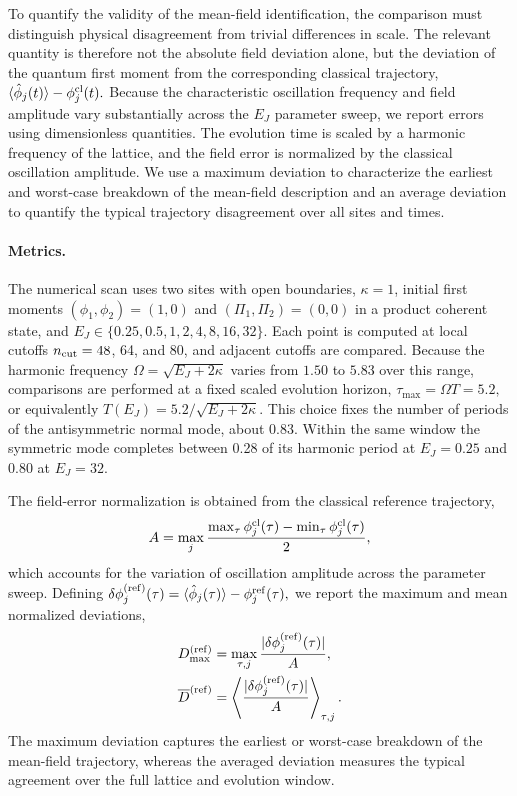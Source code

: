 \documentclass[pra,twocolumn,superscriptaddress,nofootinbib,floatfix]{revtex4-2}
\theoremstyle{remark}
\newcommand{\revcolor}{\color{blue}}
\DeclareRobustCommand{\rev}[1]{{\revcolor #1}}
\begin{document}
To quantify the validity of the mean-field identification, the comparison must distinguish physical disagreement from trivial differences in scale. The relevant quantity is therefore not the absolute field deviation alone, but the deviation of the quantum first moment from the corresponding classical trajectory, \(\langle\hat\phi_j(t)\rangle-\phi_j^{\rm cl}(t).\) Because the characteristic oscillation frequency and field amplitude vary substantially across the \(E_J\) parameter sweep, we report errors using dimensionless quantities. \rev{The evolution time is scaled by a harmonic frequency of the lattice, and the field error is normalized by the classical oscillation amplitude.} We use a maximum deviation to characterize the earliest and worst-case breakdown of the mean-field description and an average deviation to quantify the typical trajectory disagreement over all sites and times.

\paragraph{Metrics.}
\rev{The numerical scan uses two sites with open boundaries, \(\kappa=1\), initial first moments \((\phi_1,\phi_2)=(1,0)\) and \((\Pi_1,\Pi_2)=(0,0)\) in a product coherent state, and \(E_J\in\{0.25,0.5,1,2,4,8,16,32\}\).} \rev{Each point is computed at local cutoffs \(n_{\rm cut}=48\), 64, and 80, and adjacent cutoffs are compared.} \rev{Because the harmonic frequency \(\Omega=\sqrt{E_J+2\kappa}\) varies from \(1.50\) to \(5.83\) over this range, comparisons are performed at a fixed scaled evolution horizon, \(\tau_{\max}=\Omega T=5.2,\) or equivalently \(T(E_J)=5.2/\sqrt{E_J+2\kappa} .\)} \rev{This choice fixes the number of periods of the antisymmetric normal mode, about 0.83.} \rev{Within the same window the symmetric mode completes between 0.28 of its harmonic period at \(E_J=0.25\) and 0.80 at \(E_J=32\).}

The field-error normalization is obtained from the classical reference trajectory,
\[
A=\max_j\frac{\max_\tau\phi_j^{\rm cl}(\tau)-\min_\tau\phi_j^{\rm cl}(\tau)}{2},
\]
which accounts for the variation of oscillation amplitude across the parameter sweep. Defining \(\delta\phi_j^{({\rm ref})}(\tau)=\langle\hat\phi_j(\tau)\rangle-\phi_j^{\rm ref}(\tau),\) we report the maximum and mean normalized deviations,
\begin{align}
D_{\max}^{({\rm ref})}&=\max_{\tau,j}\frac{|\delta\phi_j^{({\rm ref})}(\tau)|}{A},\nonumber\\
\overline D^{({\rm ref})}&=\left\langle\frac{|\delta\phi_j^{({\rm ref})}(\tau)|}{A}\right\rangle_{\tau,j}.
\label{eq:sg-Dbar}
\end{align}
The maximum deviation captures the earliest or worst-case breakdown of the mean-field trajectory, whereas the averaged deviation measures the typical agreement over the full lattice and evolution window.
\end{document}
